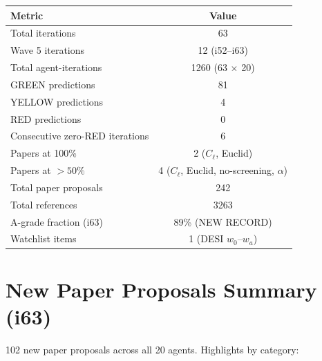 \documentclass[11pt,a4paper]{article}
\begin{document}
\begin{center}
\begin{tabular}{lc}
\toprule
\textbf{Metric} & \textbf{Value} \\
\midrule
Total iterations & 63 \\
Wave 5 iterations & 12 (i52--i63) \\
Total agent-iterations & 1260 (63 $\times$ 20) \\
GREEN predictions & 81 \\
YELLOW predictions & 4 \\
RED predictions & 0 \\
Consecutive zero-RED iterations & 6 \\
Papers at 100\% & 2 ($C_\ell$, Euclid) \\
Papers at $> 50\%$ & 4 ($C_\ell$, Euclid, no-screening, $\alpha$) \\
Total paper proposals & 242 \\
Total references & 3263 \\
A-grade fraction (i63) & 89\% (NEW RECORD) \\
Watchlist items & 1 (DESI $w_0$--$w_a$) \\
\bottomrule
\end{tabular}
\end{center}


\section{New Paper Proposals Summary (i63)}
\label{sec:papers}

102 new paper proposals across all 20 agents. Highlights by category:
\end{document}
